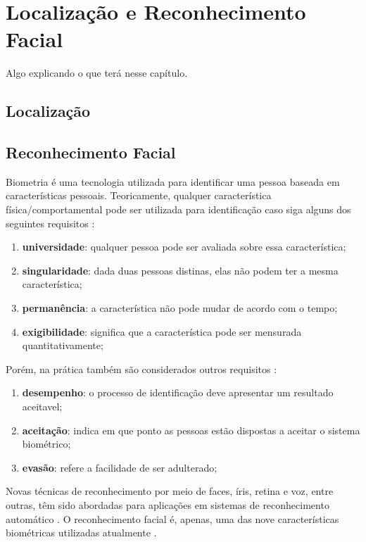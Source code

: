 
\chapter{Localização e Reconhecimento Facial}

	Algo explicando o que terá nesse capítulo.


\section{Localização}

\section{Reconhecimento Facial}

Biometria é uma tecnologia utilizada para identificar uma pessoa baseada em características pessoais. Teoricamente, qualquer característica física/comportamental pode ser utilizada para identificação caso siga alguns dos seguintes requisitos \cite{milene}: 

	\begin{enumerate}
		\item \textbf{universidade}: qualquer pessoa pode ser avaliada sobre essa característica;
		\item \textbf{singularidade}: dada duas pessoas distinas, elas não podem ter a mesma característica;
		\item \textbf{permanência}: a característica não pode mudar de acordo com o tempo;
		\item \textbf{exigibilidade}: significa que a característica pode ser mensurada quantitativamente;
	\end{enumerate}

Porém, na prática também são considerados outros requisitos \cite{milene}:

	\begin{enumerate}
		\item \textbf{desempenho}: o processo de identificação deve apresentar um resultado aceitavel;
		\item \textbf{aceitação}: indica em que ponto as pessoas estão dispostas a aceitar o sistema biométrico;
		\item \textbf{evasão}: refere a facilidade de ser adulterado;
	\end{enumerate}

Novas técnicas de reconhecimento por meio de faces, íris, retina e voz, entre outras, têm sido abordadas para aplicações em sistemas de reconhecimento automático \cite{bolle} \cite{saocarlos}. O reconhecimento facial é, apenas, uma das nove características biométricas utilizadas atualmente \cite{milene}.
	
